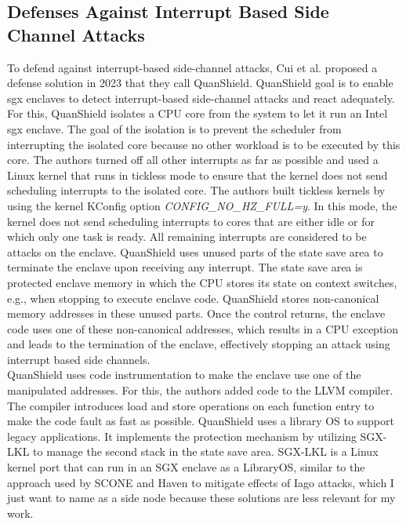 \subsection{Defenses Against Interrupt Based Side Channel Attacks}
\label{sec:20:interrupt_sca}
To defend against interrupt-based side-channel attacks, Cui et al. proposed a
defense solution in 2023 that they call QuanShield.\cite{cui_quanshield_2023}
QuanShield goal is to enable \gls{sgx} enclaves to detect interrupt-based
side-channel attacks and react adequately. For this, QuanShield isolates a CPU
core from the system to let it run an Intel \gls{sgx} enclave. The goal of the
isolation is to prevent the scheduler from interrupting the isolated core
because no other workload is to be executed by this core. The authors turned off
all other interrupts as far as possible and used a Linux kernel that runs in
tickless mode to ensure that the kernel does not send scheduling interrupts to
the isolated core. The authors built tickless kernels by using the kernel
KConfig option \textit{CONFIG\_NO\_HZ\_FULL=y}. In this mode, the kernel does
not send scheduling interrupts to cores that are either idle or for which only
one task is ready.\cite{linuxtickless} All remaining interrupts are considered
to be attacks on the enclave. QuanShield uses unused parts of the state save
area to terminate the enclave upon receiving any interrupt. The state save area
is protected enclave memory in which the CPU stores its state on context
switches, e.g., when stopping to execute enclave code. QuanShield stores
non-canonical memory addresses in these unused parts. Once the control returns,
the enclave code uses one of these non-canonical addresses, which results in a
CPU exception and leads to the termination of the enclave, effectively stopping
an attack using interrupt based side channels.\\

QuanShield uses code instrumentation to make the enclave use one of the
manipulated addresses. For this, the authors added code to the LLVM compiler.
The compiler introduces load and store operations on each function entry to make
the code fault as fast as possible. QuanShield uses a library OS to support
legacy applications. It implements the protection mechanism by utilizing SGX-LKL
to manage the second stack in the state save area. SGX-LKL is a Linux kernel
port that can run in an SGX enclave as a LibraryOS, similar to the approach used
by SCONE and Haven to mitigate effects of Iago attacks, which I just want to
name as a side node because these solutions are less relevant for my
work.\cite{priebe2019sgx,arnautov_scone_2016,baumann_shielding_2015,
    checkoway2013iago}

